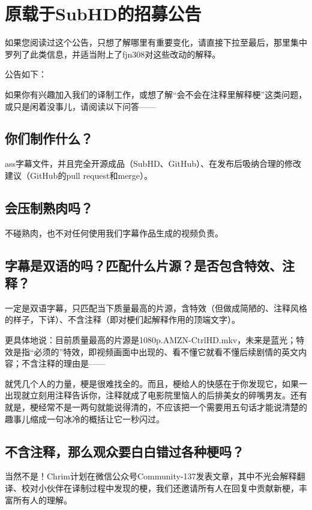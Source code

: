 \documentclass{ctexart}
\begin{document}
\appendix\em

\section{原载于SubHD的招募公告}

{\color{red} 如果您阅读过这个公告，只想了解哪里有重要变化，请直接下拉至最后，那里集中罗列了此类信息，并适当附上了fjn308对这些改动的解释。}

公告如下：

如果你有兴趣加入我们的译制工作，或想了解“会不会在注释里解释梗”这类问题，或只是闲着没事儿，请阅读以下问答——

\subsection{你们制作什么？}

ass字幕文件，并且完全开源成品（SubHD、GitHub）、在发布后吸纳合理的修改建议（GitHub的pull request和merge）。

\subsection{会压制熟肉吗？}

不碰熟肉，也不对任何使用我们字幕作品生成的视频负责。

\subsection{字幕是双语的吗？匹配什么片源？是否包含特效、注释？}

一定是双语字幕，只匹配当下质量最高的片源，含特效（但做成简陋的、注释风格的样子，下详）、不含注释（即对梗们起解释作用的顶端文字）。

更具体地说：目前质量最高的片源是1080p.AMZN-CtrlHD.mkv，未来是蓝光；特效是指“必须的”特效，即视频画面中出现的、看不懂它就看不懂后续剧情的英文内容；不含注释的理由是——

就凭几个人的力量，梗是很难找全的。而且，梗给人的快感在于你发现它，如果一出现就立刻用注释告诉你，注释就成了电影院里恼人的后排美女的碎嘴男友。还有就是，梗经常不是一两句就能说得清的，不应该把一个需要用五句话才能说清楚的趣事儿缩成一句冰冷的概括让它一秒闪过。

\subsection{不含注释，那么观众要白白错过各种梗吗？}

当然不是！Chrim计划在微信公众号Community-137发表文章，其中不光会解释翻译、校对小伙伴在译制过程中发现的梗，我们还邀请所有人在回复中贡献新梗，丰富所有人的理解。
\end{document}
